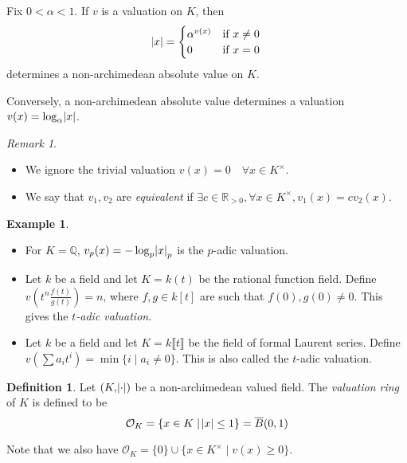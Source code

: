 \documentclass[11pt]{article}
\theoremstyle{definition}
\newtheorem{definition}{Definition}[subsection]
\newtheorem*{example}{Example}
\theoremstyle{plain}
\theoremstyle{remark}
\newtheorem*{remark}{Remark}
\newcommand{\QQ}{\mathbb{Q}}
\newcommand{\RR}{\mathbb{R}}
\newcommand{\cO}{\mathcal{O}}
\begin{document}
\noindent Fix $0 < \alpha < 1$. If $v$ is a valuation on $K$, then
\begin{equation*}
    \abs{x} =
    \begin{cases}
        \alpha^{v(x)} & \text{if } x \neq 0\\
        0 & \text{if } x = 0
    \end{cases}
\end{equation*}
determines a non-archimedean absolute value on $K$.

Conversely, a non-archimedean absolute value determines a valuation $v(x) = \log_\alpha \abs{x}$.

\begin{remark}\phantom{}
    \begin{itemize}
        \item We ignore the trivial valuation $v(x) = 0 \quad \forall x \in K^\times$.
        \item We say that $v_1, v_2$ are \emph{equivalent} if $\exists c \in \RR_{> 0}, \forall x \in K^\times, v_1(x) = c v_2(x)$.
    \end{itemize}
\end{remark}

\begin{example}\phantom{}
    \begin{itemize}
        \item For $K = \QQ$, $v_p(x) = -\log_p \abs{x}_p$ is the $p$-adic valuation.
        \item Let $k$ be a field and let $K = k(t)$ be the rational function field. Define $v(t^n \frac{f(t)}{g(t)}) = n$, where $f, g \in k[t]$ are such that $f(0), g(0) \neq 0$. This gives the \emph{$t$-adic valuation}.
        \item Let $k$ be a field and let $K = k \llbracket t \rrbracket$ be the field of formal Laurent series. Define $v(\sum a_i t^i) = \min \{i \mid a_i \neq 0\}$. This is also called the $t$-adic valuation.
    \end{itemize}
\end{example}

\begin{definition}\label{def:2_2}
    Let $(K, \abs{\cdot})$ be a non-archimedean valued field. The \emph{valuation ring} of $K$ is defined to be
    \begin{equation*}
        \cO_K = \{x \in K \mid \abs{x} \le 1\} = \overline{B}(0, 1)
    \end{equation*}
\end{definition}
\noindent Note that we also have $\cO_K = \{0\} \cup \{x \in K^\times \mid v(x) \ge 0\}$.
\end{document}
